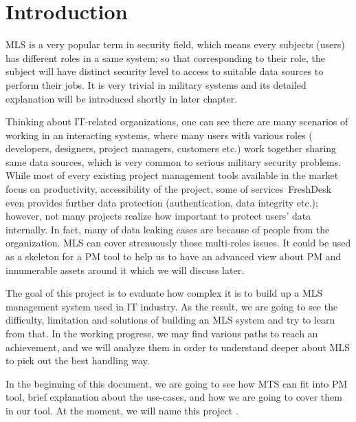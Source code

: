 
\chapter{Introduction} %

\label{ch:introduction} %


MLS is a very popular term in security field, which means every subjects (\ie users) has different roles in a same system;
so that corresponding to their role, the subject will have distinct security level to access to suitable data sources to perform their jobs.
It is very trivial in military systems and its detailed explanation will be introduced shortly in later chapter.

Thinking about IT-related organizations, one can see there are many scenarios of working in an interacting systems, where many users with various roles (\eg\,developers, designers, project managers, customers etc.) work together sharing same data sources, which is very common to serious military security problems.
While most of every existing project management tools available in the market focus on productivity, accessibility of the project, some of services \eg\,FreshDesk even provides further data protection (authentication, data integrity etc.);
however, not many projects realize how important to protect users' data internally. In fact, many of data leaking cases are because of people from the organization. MLS can cover strenuously those multi-roles issues. It could be used as a skeleton for a PM tool to help us to have an advanced view about PM and innumerable assets around it which we will discuss later.

The goal of this project is to evaluate how complex it is to build up a MLS management system used in IT industry.
As the result, we are going to see the difficulty, limitation and solutions of building an MLS system and try to learn from that.
In the working progress, we may find various paths to reach an achievement, and we will analyze them in order to understand deeper about MLS to pick out the best handling way.

In the beginning of this document, we are going to see how MTS can fit into PM tool, brief explanation about the use-cases, and how we are going to cover them in our tool.
At the moment, we will name this project \myProject.

